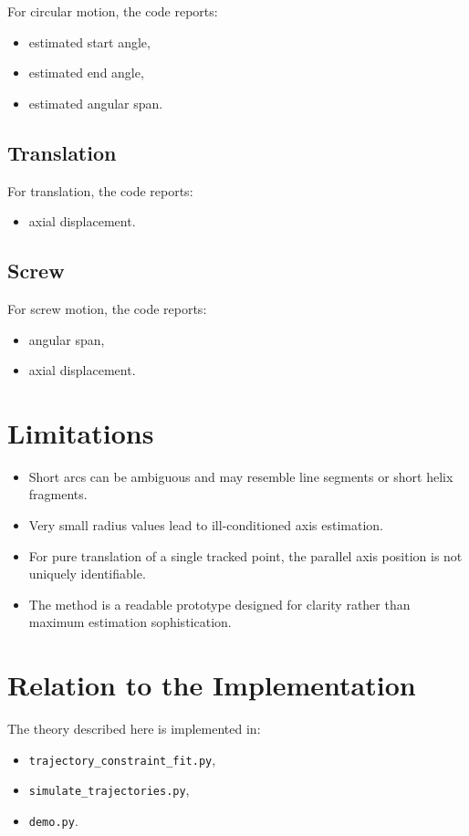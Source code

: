 \documentclass[11pt]{article}
\begin{document}
For circular motion, the code reports:
\begin{itemize}
    \item estimated start angle,
    \item estimated end angle,
    \item estimated angular span.
\end{itemize}

\subsection{Translation}

For translation, the code reports:
\begin{itemize}
    \item axial displacement.
\end{itemize}

\subsection{Screw}

For screw motion, the code reports:
\begin{itemize}
    \item angular span,
    \item axial displacement.
\end{itemize}

\section{Limitations}

\begin{itemize}
    \item Short arcs can be ambiguous and may resemble line segments or short helix fragments.
    \item Very small radius values lead to ill-conditioned axis estimation.
    \item For pure translation of a single tracked point, the parallel axis position is not uniquely identifiable.
    \item The method is a readable prototype designed for clarity rather than maximum estimation sophistication.
\end{itemize}

\section{Relation to the Implementation}

The theory described here is implemented in:
\begin{itemize}
    \item \texttt{trajectory\_constraint\_fit.py},
    \item \texttt{simulate\_trajectories.py},
    \item \texttt{demo.py}.
\end{itemize}
\end{document}
